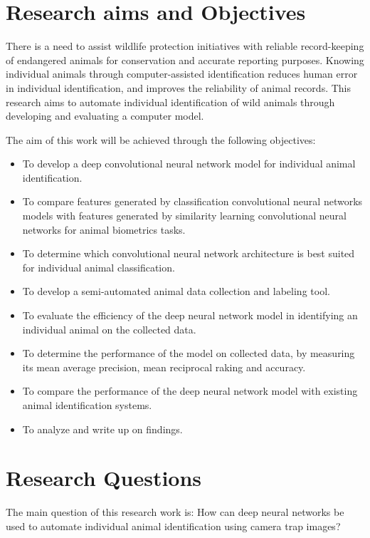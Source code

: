 \section{Research  aims  and Objectives}
There is a need to assist wildlife protection initiatives with reliable record-keeping of endangered animals for conservation and accurate reporting purposes. Knowing individual animals through computer-assisted identification reduces human error in individual identification, and improves the reliability of animal records. This research aims to automate individual identification of wild animals through developing and evaluating a computer model. 

The aim of this work will be achieved through the following objectives: 

\begin{itemize}

    \item To develop a deep convolutional neural network model for individual animal identification.
    \item To compare features generated by classification convolutional neural networks models with features generated by similarity learning convolutional neural networks for animal biometrics tasks.
    \item To determine which convolutional neural network architecture is best suited for individual animal classification.
    \item To develop a semi-automated animal data collection and labeling tool.
    \item To evaluate the efficiency of the deep neural network model in identifying an individual animal on the collected data.
    \item To determine the performance of the model on collected data, by measuring its mean average precision, mean reciprocal raking and accuracy. 
    \item To compare the performance of the deep neural network model with existing animal identification systems. 
    \item To analyze and write up on findings.  
\end{itemize}
\section{Research Questions}
The main question of this research work is: 
How can deep neural networks be used to automate individual animal identification using camera trap images?


